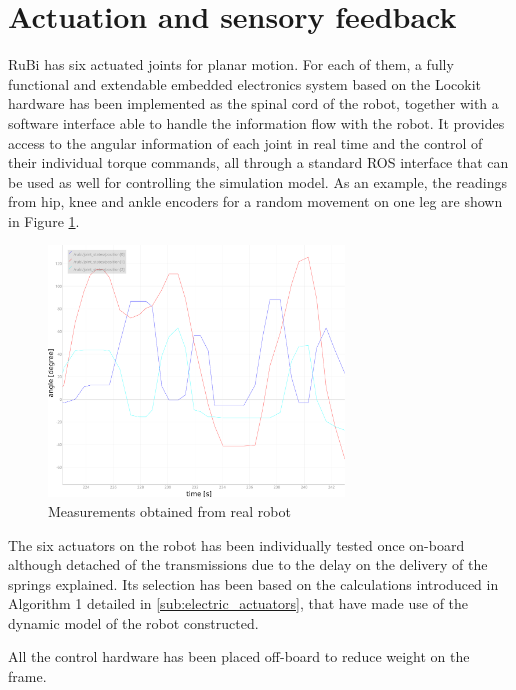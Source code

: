 
\section{Actuation and sensory feedback} %
\label{sec:actuation_and_sensory_feedback}
RuBi has six actuated joints for planar motion.
For each of them, a fully functional and extendable embedded electronics system based on the Locokit hardware has been implemented as the spinal cord of the robot, together with a software interface able to handle the information flow with the robot.
It provides access to the angular information of each joint in real time and the control of their individual torque commands, all through a standard ROS interface that can be used as well for controlling the simulation model.
As an example, the readings from hip, knee and ankle encoders for a random movement on one leg are shown in Figure \ref{fig:position_measurements}.


\begin{figure}[htb]
  \centering
  \includegraphics[width=0.7\textwidth]{figures/position_measurements.pdf}
  \caption{Measurements obtained from real robot}
  \label{fig:position_measurements}
\end{figure}


The six actuators on the robot has been individually tested once on-board although detached of the transmissions due to the delay on the delivery of the springs explained.
Its selection has been based on the calculations introduced in Algorithm 1 detailed in \ref{sub:electric_actuators}, that have made use of the dynamic model of the robot constructed.

All the control hardware has been placed off-board to reduce weight on the frame.

